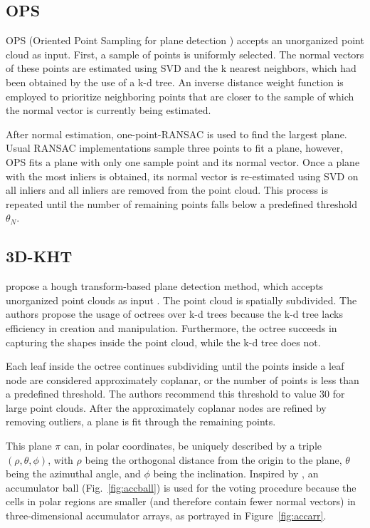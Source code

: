 \documentclass[main.tex]{subfiles}
\begin{document}
\subsection{OPS}
OPS (Oriented Point Sampling for plane detection \cite{Sun_Mordohai_2019}) accepts an unorganized point cloud as input.
First, a sample of points is uniformly selected. The normal vectors of these points are estimated using SVD and the k nearest neighbors, which had been obtained by the use of a k-d tree.
An inverse distance weight function is employed to prioritize neighboring points that are closer to the sample of which the normal vector is currently being estimated.


After normal estimation, one-point-RANSAC is used to find the largest plane. Usual RANSAC implementations sample three points to fit a plane, however, OPS fits a plane with only one sample point and its normal vector.
Once a plane with the most inliers is obtained, its normal vector is re-estimated using SVD on all inliers and all inliers are removed from the point cloud.
This process is repeated until the number of remaining points falls below a predefined threshold $\theta_N$.

\subsection{3D-KHT}\label{sub:3dkht}
\citeauthor{Limberger_Oliveira_2015} propose a hough transform-based plane detection method, which accepts unorganized point clouds as input \cite{Limberger_Oliveira_2015}.
The point cloud is spatially subdivided. The authors propose the usage of octrees over k-d trees because the k-d tree lacks efficiency in creation and manipulation. 
Furthermore, the octree succeeds in capturing the shapes inside the point cloud, while the k-d tree does not.

Each leaf inside the octree continues subdividing until the points inside a leaf node are considered approximately coplanar, or the number of points is less than a predefined threshold. 
The authors recommend this threshold to value 30 for large point clouds. 
After the approximately coplanar nodes are refined by removing outliers, a plane is fit through the remaining points.

This plane $\pi$ can, in polar coordinates, be uniquely described by a triple $(\rho, \theta, \phi)$, with $\rho$ being the orthogonal distance from the origin to the plane, $\theta$ being the azimuthal angle, and $\phi$ being the inclination.
Inspired by \citeauthor{Borrmann_Elseberg_Lingemann_Nüchter_2011}\cite{Borrmann_Elseberg_Lingemann_Nüchter_2011}, an accumulator ball (Fig.~\ref{fig:accball}) is used for the voting procedure because the cells in polar regions are smaller (and therefore
contain fewer normal vectors) in three-dimensional accumulator arrays, as portrayed in Figure~\ref{fig:accarr}.
\end{document}
